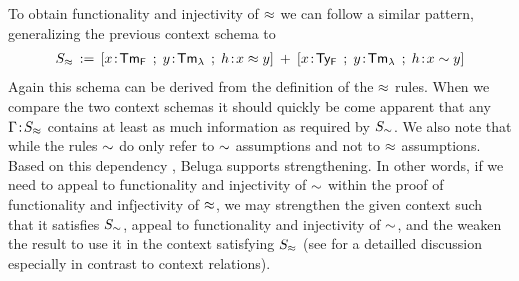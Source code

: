 To obtain functionality and injectivity of $\mathrel{\approx}$ we can follow a similar pattern, generalizing the previous context schema  to
\begin{align*}
  S_{\tmr} \eqdef [x\of\TmF \mrel{;} y\of\TmL \mrel{;} h\of x \tmr y] \mrel{+} [x\of\TyF \mrel{;} y\of\TmL \mrel{;} h\of x \tyr y]
\end{align*}
Again this schema can be derived from the definition of the $\mathrel{\approx}$ rules.
When we compare the two context schemas it should quickly be come apparent that any $\Gamma \!:\! S_{\mathrel{\approx}}$ contains at least as much information as required by $S_{\mathrel{\sim}}$. We also note that while the rules $\mathrel{\sim}$ do only refer to $\mathrel{\sim}$ assumptions and not to $\mathrel{\approx}$ assumptions. Based on this dependency \cite{Virga99phd}, Beluga supports strengthening. In other words, if we need to appeal to functionality and injectivity of $\mathrel{\sim}$ within the proof of functionality and infjectivity of $\mathrel{\approx}$, we may strengthen the given context such that it satisfies $S_{\mathrel{\sim}}$, appeal to functionality and injectivity of $\mathrel{\sim}$, and the weaken the result to use it in the context satisfying $S_{\mathrel{\approx}}$ (see \cite{Felty:orbi-survey} for a detailled discussion especially in contrast to context relations).


